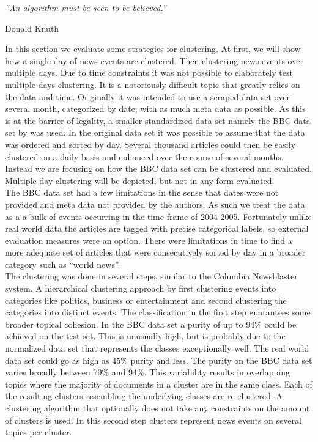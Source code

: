 \epigraph{\emph{
  ``An algorithm must be seen to be believed.''
}}{ Donald Knuth }

In this section we evaluate some strategies for clustering. At first, we will show how a single day of news events are clustered. Then clustering news events over multiple days. Due to time constraints it was not possible to elaborately test multiple days clustering. It is a notoriously difficult topic that greatly relies on the data and time. Originally it was intended to use a scraped data set over several month, categorized by date, with as much meta data as possible. As this is at the barrier of legality, a smaller standardized data set namely the BBC data set by \cite{BBCData2006} was used. In the original data set it was possible to assume that the data was ordered and sorted by day. Several thousand articles could then be easily clustered on a daily basis and enhanced over the course of several months. Instead we are focusing on how the BBC data set can be clustered and evaluated. Multiple day clustering will be depicted, but not in any form evaluated.\\

The BBC data set had a few limitations in the sense that dates were not provided and meta data not provided by the authors. As such we treat the data as a a bulk of events occurring in the time frame of 2004-2005. Fortunately unlike real world data the articles are tagged with precise categorical labels, so external evaluation measures were an option. There were limitations in time to find a more adequate set of articles that were consecutively sorted by day in a broader category such as ``world news''.\\

The clustering was done in several steps, similar to the Columbia Newsblaster system.\cite{NewsBlaster2002} A hierarchical clustering approach by first clustering events into categories like politics, business or entertainment and second clustering the categories into distinct events. The classification in the first step guarantees some broader topical cohesion. In the BBC data set a purity of up to 94\% could be achieved on the test set. This is unusually high, but is probably due to the normalized data set that represents the classes exceptionally well. The real world data set could go as high as 45\% purity and less. The purity on the BBC data set varies broadly between 79\% and 94\%. This variability results in overlapping topics where the majority of documents in a cluster are in the same class. Each of the resulting clusters resembling the underlying classes are re clustered. A clustering algorithm that optionally does not take any constraints on the amount of clusters is used. In this second step clusters represent news events on several topics per cluster.\\

